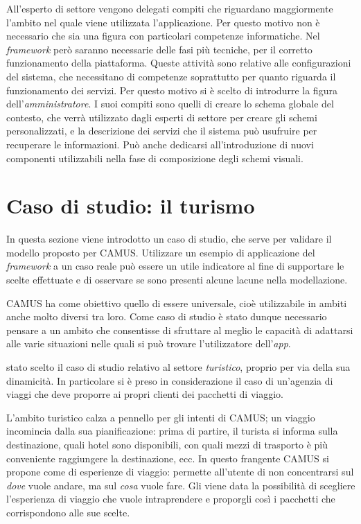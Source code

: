 All'esperto di settore vengono delegati compiti che riguardano maggiormente l'ambito nel quale viene utilizzata l'applicazione. Per questo motivo non è necessario che sia una figura con particolari competenze informatiche. Nel \emph{framework} però saranno necessarie delle fasi più tecniche, per il corretto funzionamento della piattaforma. Queste attività sono relative alle configurazioni del sistema, che necessitano di competenze soprattutto per quanto riguarda il funzionamento dei servizi. Per questo motivo si è scelto di introdurre la figura dell'\emph{amministratore}. I suoi compiti sono quelli di creare lo schema globale del contesto, che verrà utilizzato dagli esperti di settore per creare gli schemi personalizzati, e la descrizione dei servizi che il sistema può usufruire per recuperare le informazioni. Può anche dedicarsi all'introduzione di nuovi componenti utilizzabili nella fase di composizione degli schemi visuali.

\section{Caso di studio: il turismo\label{sec:caso-studio-turismo}}

In questa sezione viene introdotto un caso di studio, che serve per validare il modello proposto per CAMUS. Utilizzare un esempio di applicazione del \emph{framework} a un caso reale può essere un utile indicatore al fine di supportare le scelte effettuate e di osservare se sono presenti alcune lacune nella modellazione.

CAMUS ha come obiettivo quello di essere universale, cioè utilizzabile in ambiti anche molto diversi tra loro. Come caso di studio è stato dunque necessario pensare a un ambito che consentisse di sfruttare al meglio le capacità di adattarsi alle varie situazioni nelle quali si può trovare l'utilizzatore dell'\emph{app}.

\upe stato scelto il caso di studio relativo al settore \emph{turistico}, proprio per via della sua dinamicità. In particolare si è preso in considerazione il caso di un'agenzia di viaggi che deve proporre ai propri clienti dei pacchetti di viaggio.

L'ambito turistico calza a pennello per gli intenti di CAMUS; un viaggio incomincia dalla sua pianificazione: prima di partire, il turista si informa sulla destinazione, quali hotel sono disponibili, con quali mezzi di trasporto è più conveniente raggiungere la destinazione, ecc. In questo frangente CAMUS si propone come  di esperienze di viaggio: permette all'utente di non concentrarsi sul \emph{dove} vuole andare, ma sul \emph{cosa} vuole fare. Gli viene data la possibilità di scegliere l'esperienza di viaggio che vuole intraprendere e proporgli così i pacchetti che corrispondono alle sue scelte.

